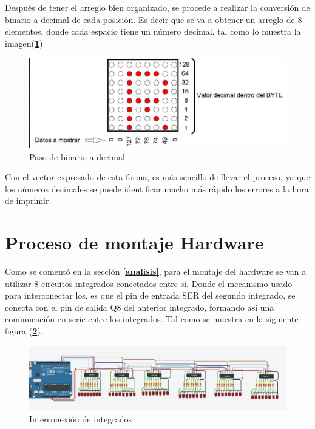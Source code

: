 \documentclass{article}
\begin{document}
Después de tener el arreglo bien organizado, se procede a realizar la conversión de binario a decimal de cada posición. Es decir que se va a obtener un arreglo de 8 elementos, donde cada espacio tiene un número decimal. tal como lo muestra la imagen(\textbf{\ref{decbin}})

    \begin{figure}[h]
    \includegraphics[width=12cm]{decbin.png}
    \centering
    \caption{Paso de binario a decimal}
    \label{decbin}
    \end{figure}
    
Con el vector expresado de esta forma, es más sencillo de llevar el proceso, ya que los números decimales se puede identificar mucho más rápido los errores a la hora de imprimir.

\section{Proceso de montaje Hardware}\label{montaje}
Como se comentó en la sección \textbf{\ref{analisis}}, para el montaje del hardware se van a utilizar 8 circuitos integrados conectados entre sí. Donde el mecanismo usado para interconectar los, es que el pin de entrada SER del segundo integrado, se conecta con el pin de  salida  Q8 del anterior integrado, formando así una cominucación en serie entre los integrados. Tal como se muestra en la siguiente figura (\textbf{\ref{inter}}).

    \begin{figure}[h]
    \includegraphics[width=14cm]{inter.jpeg}
    \centering
    \caption{Interconexión de integrados}
    \label{inter}
    \end{figure}





\end{document}
